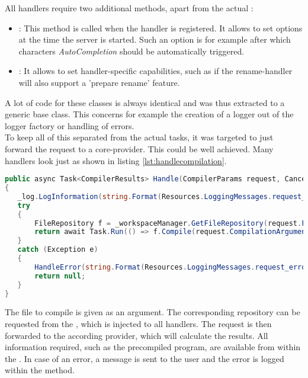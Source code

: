 All handlers require two additional methods, apart from the actual :
\begin{itemize}
    \item {}: This method is called when the handler is registered.
    It allows to set options at the time the server is started.
    Such an option is for example after which characters \textit{AutoCompletion} should be automatically triggered.
    \item {}: It allows to set handler-specific capabilities, such as if the rename-handler will also support a 'prepare rename' feature.
\end{itemize}

A lot of code for these classes is always identical and was thus extracted to a generic base class.
This concerns for example the creation of a logger out of the logger factory or handling of errors.\\

To keep all of this separated from the actual tasks, it was targeted to just forward the request to a core-provider.
This could be well achieved.
Many handlers look just as shown in listing \ref{lst:handlecompilation}.

\begin{lstlisting}[language=csharp, caption={Handling Compilation}, captionpos=b, label={lst:handlecompilation}]
public async Task<CompilerResults> Handle(CompilerParams request, CancellationToken cancellationToken)
{
   _log.LogInformation(string.Format(Resources.LoggingMessages.request_handle, _method));
   try
   {
       FileRepository f = _workspaceManager.GetFileRepository(request.FileToCompile);
       return await Task.Run(() => f.Compile(request.CompilationArguments), cancellationToken);
   }
   catch (Exception e)
   {
       HandleError(string.Format(Resources.LoggingMessages.request_error, _method), e);
       return null;
   }
}
\end{lstlisting}

The file to compile is given as an argument.
The corresponding repository can be requested from the , which is injected to all handlers.
The request is then forwarded to the according provider, which will calculate the results.
All information required, such as the precompiled program, are available from within the .
In case of an error, a message is sent to the user and the error is logged within the  method.\\

